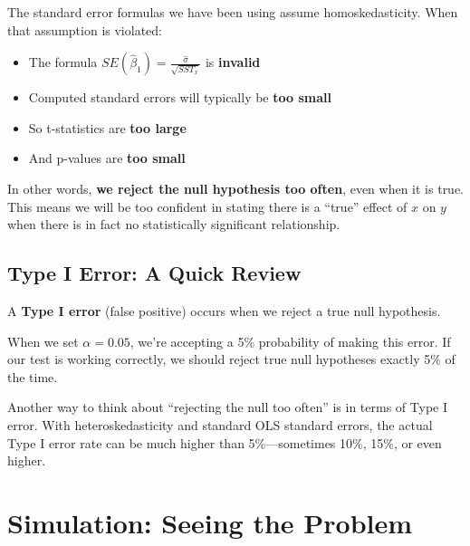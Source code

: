 \documentclass[
  letterpaper,
  DIV=11,
  numbers=noendperiod]{scrreprt}
\providecommand{\tightlist}{%
  \setlength{\itemsep}{0pt}\setlength{\parskip}{0pt}}
\begin{document}
The standard error formulas we have been using assume homoskedasticity.
When that assumption is violated:

\begin{itemize}
\tightlist
\item
  The formula \(SE(\hat{\beta}_1) = \frac{\hat{\sigma}}{\sqrt{SST_x}}\)
  is \textbf{invalid}
\item
  Computed standard errors will typically be \textbf{too small}
\item
  So t-statistics are \textbf{too large}
\item
  And p-values are \textbf{too small}
\end{itemize}

In other words, \textbf{we reject the null hypothesis too often}, even
when it is true. This means we will be too confident in stating there is
a ``true'' effect of \(x\) on \(y\) when there is in fact no
statistically significant relationship.

\subsection{Type I Error: A Quick
Review}\label{type-i-error-a-quick-review}

\begin{tcolorbox}[enhanced jigsaw, arc=.35mm, bottomrule=.15mm, bottomtitle=1mm, breakable, colback=white, colbacktitle=quarto-callout-important-color!10!white, colframe=quarto-callout-important-color-frame, coltitle=black, left=2mm, leftrule=.75mm, opacityback=0, opacitybacktitle=0.6, rightrule=.15mm, title=\textcolor{quarto-callout-important-color}{\faExclamation}\hspace{0.5em}{Type I Error}, titlerule=0mm, toprule=.15mm, toptitle=1mm]

A \textbf{Type I error} (false positive) occurs when we reject a true
null hypothesis.

When we set \(\alpha = 0.05\), we're accepting a 5\% probability of
making this error. If our test is working correctly, we should reject
true null hypotheses exactly 5\% of the time.

\end{tcolorbox}

Another way to think about ``rejecting the null too often'' is in terms
of Type I error. With heteroskedasticity and standard OLS standard
errors, the actual Type I error rate can be much higher than
5\%---sometimes 10\%, 15\%, or even higher.

\section{Simulation: Seeing the
Problem}\label{simulation-seeing-the-problem}
\end{document}

